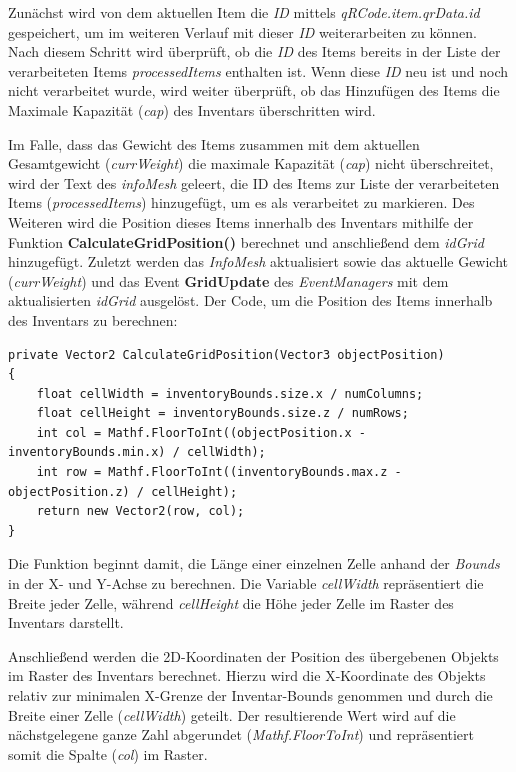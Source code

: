 Zunächst wird von dem aktuellen Item die \textit{ID} mittels \textit{qRCode.item.qrData.id} gespeichert, um im weiteren
Verlauf mit dieser \textit{ID} weiterarbeiten zu können. Nach diesem Schritt wird überprüft, ob die \textit{ID} des Items
bereits in der Liste der verarbeiteten Items \textit{processedItems} enthalten ist. Wenn diese \textit{ID} neu ist und
noch nicht verarbeitet wurde, wird weiter überprüft, ob das Hinzufügen des Items die Maximale Kapazität (\textit{cap})
des Inventars überschritten wird.

Im Falle, dass das Gewicht des Items zusammen mit dem aktuellen Gesamtgewicht (\textit{currWeight}) die maximale Kapazität
(\textit{cap}) nicht überschreitet, wird der Text des \textit{infoMesh} geleert, die ID des Items zur Liste der
verarbeiteten Items (\textit{processedItems}) hinzugefügt, um es als verarbeitet zu markieren. Des Weiteren wird die Position
dieses Items innerhalb des Inventars mithilfe der Funktion \textbf{CalculateGridPosition()} berechnet und anschließend dem
\textit{idGrid} hinzugefügt. Zuletzt werden das \textit{InfoMesh} aktualisiert sowie das aktuelle Gewicht (\textit{currWeight})
und das Event \textbf{GridUpdate} des \textit{EventManagers} mit dem aktualisierten \textit{idGrid} ausgelöst. Der Code,
um die Position des Items innerhalb des Inventars zu berechnen:
\begin{lstlisting}[caption={Position des Items berechnen}, label=code:controller_calcPos, language={[Sharp]C}]
private Vector2 CalculateGridPosition(Vector3 objectPosition)
{
    float cellWidth = inventoryBounds.size.x / numColumns;
    float cellHeight = inventoryBounds.size.z / numRows;
    int col = Mathf.FloorToInt((objectPosition.x - inventoryBounds.min.x) / cellWidth);
    int row = Mathf.FloorToInt((inventoryBounds.max.z - objectPosition.z) / cellHeight);
    return new Vector2(row, col);
}
\end{lstlisting}
Die Funktion beginnt damit, die Länge einer einzelnen Zelle anhand der \textit{Bounds} in der X- und Y-Achse zu berechnen.
Die Variable \textit{cellWidth} repräsentiert die Breite jeder Zelle, während \textit{cellHeight} die Höhe jeder Zelle
im Raster des Inventars darstellt.

Anschließend werden die 2D-Koordinaten der Position des übergebenen Objekts im Raster des Inventars berechnet. Hierzu
wird die X-Koordinate des Objekts relativ zur minimalen X-Grenze der Inventar-Bounds genommen und durch die Breite einer
Zelle (\textit{cellWidth}) geteilt. Der resultierende Wert wird auf die nächstgelegene ganze Zahl abgerundet
(\textit{Mathf.FloorToInt}) und repräsentiert somit die Spalte (\textit{col}) im Raster.

